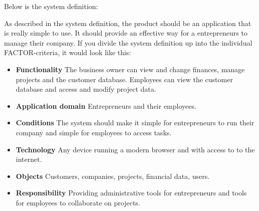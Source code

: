 Below is the system definition:

\relax

As described in the system definition, the product should be an application that is really simple to use. It should provide an effective way for a entrepreneurs to manage their company.
If you divide the system definition up into the individual FACTOR-criteria, it would look like this:

\begin{itemize}
    \item \textbf{Functionality} The business owner can view and change finances, manage projects and the customer database. Employees can view the customer database and access and modify project data.
    \item \textbf{Application domain} Entrepreneurs and their employees.
    \item \textbf{Conditions} The system should make it simple for entrepreneurs to run their company and simple for employees to access tasks.
    \item \textbf{Technology} Any device running a modern browser and with access to to the internet.
    \item \textbf{Objects} Customers, companies, projects, financial data, users.
    \item \textbf{Responsibility} Providing administrative tools for entrepreneurs and tools for employees to collaborate on projects.
\end{itemize}


